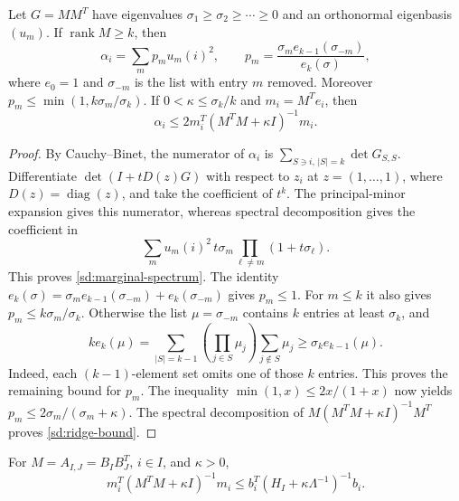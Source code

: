 \begin{lemma}\label{sd:ridge}
Let $G=MM^T$ have eigenvalues $\sigma_1\geq\sigma_2\geq\cdots\geq0$
and an orthonormal eigenbasis $(u_m)$.  If $\operatorname{rank}M\geq k$,
then
\begin{equation}\label{sd:marginal-spectrum}
 \alpha_i=\sum_m p_m u_m(i)^2,\qquad
 p_m=\frac{\sigma_m e_{k-1}(\sigma_{-m})}{e_k(\sigma)},
\end{equation}
where $e_0=1$ and $\sigma_{-m}$ is the list with entry $m$ removed.
Moreover $p_m\leq\min(1,k\sigma_m/\sigma_k)$.
If $0<\kappa\leq\sigma_k/k$ and $m_i=M^Te_i$, then
\begin{equation}\label{sd:ridge-bound}
 \alpha_i\leq2m_i^T(M^TM+\kappa I)^{-1}m_i.
\end{equation}
\end{lemma}

\begin{proof}
By Cauchy--Binet, the numerator of $\alpha_i$ is
$\sum_{S\ni i,\,|S|=k}\det G_{S,S}$.
Differentiate $\det(I+tD(z)G)$ with respect to $z_i$ at
$z=(1,\ldots,1)$, where $D(z)=\operatorname{diag}(z)$, and take
the coefficient of $t^k$.  The principal-minor expansion gives
this numerator, whereas spectral decomposition gives the
coefficient in
\[
 \sum_m u_m(i)^2\,t\sigma_m
                     \prod_{\ell\ne m}(1+t\sigma_\ell).
\]
This proves \eqref{sd:marginal-spectrum}.
The identity
$e_k(\sigma)=\sigma_me_{k-1}(\sigma_{-m})+e_k(\sigma_{-m})$
gives $p_m\leq1$.  For $m\leq k$ it also gives
$p_m\leq k\sigma_m/\sigma_k$.  Otherwise the list
$\mu=\sigma_{-m}$ contains $k$ entries at least $\sigma_k$, and
\[
 k e_k(\mu)
 =\sum_{|S|=k-1}\left(\prod_{j\in S}\mu_j\right)
                       \sum_{j\notin S}\mu_j
 \geq\sigma_k e_{k-1}(\mu).
\]
Indeed, each $(k-1)$-element set omits one of those $k$ entries.
This proves the remaining bound for $p_m$.
The inequality $\min(1,x)\leq2x/(1+x)$ now yields
$p_m\leq2\sigma_m/(\sigma_m+\kappa)$.
The spectral decomposition of
$M(M^TM+\kappa I)^{-1}M^T$ proves \eqref{sd:ridge-bound}.
\end{proof}

\begin{lemma}\label{sd:ridge-comparison}
For $M=A_{I,J}=B_IB_J^T$, $i\in I$, and $\kappa>0$,
\begin{equation}\label{sd:ridge-gram}
 m_i^T(M^TM+\kappa I)^{-1}m_i
 \leq b_i^T(H_I+\kappa\Lambda^{-1})^{-1}b_i .
\end{equation}
\end{lemma}

